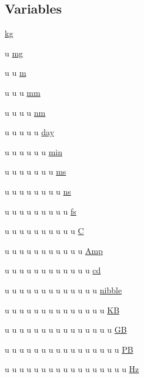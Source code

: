\subsection*{Variables}
\begin{DoxyCompactItemize}
\item 
\hyperlink{namespacemui_1_1dim_aa5475efc20b5f0180d313d775c795e3a}{kg}
\item 
u \hyperlink{namespacemui_1_1dim_a061f30f84c37cd1c4af2816807a8e72f}{mg}
\item 
u u \hyperlink{namespacemui_1_1dim_a712aced9b0e9ae81c112b61d1776f5fa}{m}
\item 
u u u \hyperlink{namespacemui_1_1dim_a0ceae14fd1eeec1d9b94242da6911d16}{mm}
\item 
u u u u \hyperlink{namespacemui_1_1dim_a52233b1fe104c1c48b69dc0a32d1d22b}{nm}
\item 
u u u u u \hyperlink{namespacemui_1_1dim_a0af13d9d33c597e5746a5b87e961e671}{day}
\item 
u u u u u u \hyperlink{namespacemui_1_1dim_a4a9165384ff5faa33438dbd45aa99350}{min}
\item 
u u u u u u u \hyperlink{namespacemui_1_1dim_a4a1770f3ddf89b543eff07fed4bcd217}{ms}
\item 
u u u u u u u u \hyperlink{namespacemui_1_1dim_a7431e2ecfb6ef10c86f9483d56f71517}{ns}
\item 
u u u u u u u u u \hyperlink{namespacemui_1_1dim_a01063adf0a3fc25209df5d5e186b8886}{fs}
\item 
u u u u u u u u u u \hyperlink{namespacemui_1_1dim_a819cc406ce7c3b35bd3bbd6724ff8d42}{C}
\item 
u u u u u u u u u u u \hyperlink{namespacemui_1_1dim_ac013a8ddbd164a00b696e1fbe3233f87}{Amp}
\item 
u u u u u u u u u u u u \hyperlink{namespacemui_1_1dim_ab696eff2ae551b4df3f86066522b86d7}{cd}
\item 
u u u u u u u u u u u u u \hyperlink{namespacemui_1_1dim_af5abc72ea6f864d19a5cd903c07bba9b}{nibble}
\item 
u u u u u u u u u u u u u u \hyperlink{namespacemui_1_1dim_a831e519004cdc232c4e254ab3955e2a5}{KB}
\item 
u u u u u u u u u u u u u u u \hyperlink{namespacemui_1_1dim_a215fe683376fa878263dcf9e4c9b2cd2}{GB}
\item 
u u u u u u u u u u u u u u u u \hyperlink{namespacemui_1_1dim_a4c63556da0b02027507e087bdccad5db}{PB}
\item 
u u u u u u u u u u u u u u u u u \hyperlink{namespacemui_1_1dim_ace39205b1f9591e51866a1c4f463a13b}{Hz}

\end{DoxyCompactItemize}
